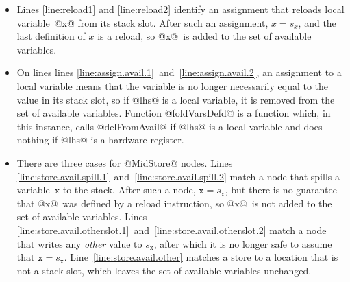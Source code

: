 \documentclass[blockstyle,preprint,natbib,nocopyrightspace]{sigplanconf}
\newcommand\linepairref[2]{lines \ref{line:#1}~and~\ref{line:#2}}
\newcommand\Lineref[1]{Line~\ref{line:#1}}
\newcommand\Linepairref[2]{Lines \ref{line:#1}~and~\ref{line:#2}}
\newcommand\slotof[1]{\ensuremath{s_{#1}}}
\let\slotOf=\slotof
\newcommand{\authornote}[1]{{\em #1}}
\def\authornote#1{\unskip\relax}
\newcommand{\simon}[1]{\authornote{SLPJ: #1}}
\newcommand{\norman}[1]{\authornote{NR: #1}}
\let\remark\norman
\def\finalremark#1{\relax}
\newcommand{\john}[1]{\authornote{JD: #1}}
\begin{document}
\begin{itemize}
\item
Lines \ref{line:reload1} and \ref{line:reload2}
identify an assignment that reloads local
variable~@x@ from its stack slot.\finalremark{I propose the compiler be
modified to use @isStackSlotOf@ as I've written. JD~approves.}
After such an assignment, $x = \slotof x$,
and the last definition of $x$ is a reload,
so @x@~is added to the set of available variables.\remark{Check these bullets against the figure for correctness}
\item
On lines \linepairref{assign.avail.1}{assign.avail.2},
an assignment to a local variable means that the
variable is no longer necessarily equal to the value in its stack
slot, so if @lhs@ is a local variable, it is removed from the set of
available variables.
Function @foldVarsDefd@ is a function which, in this
instance, calls @delFromAvail@ if @lhs@ is a local variable and does
nothing if @lhs@ is a hardware register.
\item 
There are three cases for @MidStore@ nodes.
\Linepairref{store.avail.spill.1}{store.avail.spill.2}
match a node that spills a variable~$\mathtt{x}$ to the stack.
After such a node, $\mathtt{x} = \slotOf {\mathtt{x}}$,
but there is no guarantee that @x@~was defined by a reload instruction,
so @x@~is not added to the set of available variables.
%
\Linepairref{store.avail.otherslot.1}{store.avail.otherslot.2}
match a node that writes any \emph{other} value to \slotOf {\mathtt x},
after which it is no longer safe to assume that $\mathtt x = \slotof {\mathtt{x}}$.
%
\Lineref{store.avail.other} matches a store to a location that is not
a stack slot, which leaves the set of available variables unchanged.




\end{itemize}
\end{document}
